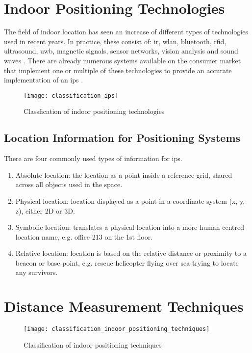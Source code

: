 \section{Indoor Positioning Technologies}
The field of indoor location has seen an increase of different types of technologies used in recent years. In practice, these consist of: \acrfull{ir}, \acrfull{wlan}, bluetooth, \acrfull{rfid}, ultrasound, \acrfull{uwb}, magnetic signals, sensor networks, vision analysis and sound waves \cite{Gu2009}. There are already numerous systems available on the consumer market that implement one or multiple of these technologies to provide an accurate implementation of an \acrshort{ips} \cite{KristianJorstad2016}.
\begin{figure}[h!]
\centering
\texttt{[image: classification\_ips]}
\caption{Classfication of indoor positioning technologies~\cite{ComparativeSurvey}}
\label{fig:ips_classification}
\end{figure}
\subsection{Location Information for Positioning Systems}
There are four commonly used types of information for \acrshort{ips}\cite{Liu2007}.
\begin{enumerate}
\item Absolute location: the location as a point inside a reference grid, shared across all objects used in the space.
\item Physical location: location displayed as a point in a coordinate system (x, y, z), either 2D or 3D.
\item Symbolic location: translates a physical location into a more human centred location name, e.g. office 213 on the 1st floor.
\item Relative location: location is based on the relative distance or proximity to a beacon or base point, e.g. rescue helicopter flying over sea trying to locate any survivors.
\end{enumerate}
\section{Distance Measurement Techniques}
\begin{figure}[h!]
\centering
\texttt{[image: classification\_indoor\_positioning\_techniques]}
\caption{Classification of indoor positioning techniques~\cite{Sakpere2017}}
\label{fig:ips_techniques}
\end{figure}
